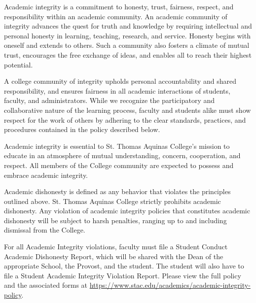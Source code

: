 \documentclass[11pt,letterpaper]{article}
\begin{document}



Academic integrity is a commitment to honesty, trust, fairness, respect, and responsibility within an academic community. An academic community of integrity advances the quest for truth and knowledge by requiring intellectual and personal honesty in learning, teaching, research, and service. Honesty begins with oneself and extends to others. Such a community also fosters a climate of mutual trust, encourages the free exchange of ideas, and enables all to reach their highest potential. \pspace

A college community of integrity upholds personal accountability and shared responsibility, and ensures fairness in all academic interactions of students, faculty, and administrators. While we recognize the participatory and collaborative nature of the learning process, faculty and students alike must show respect for the work of others by adhering to the clear standards, practices, and procedures contained in the policy described below. \pspace

Academic integrity is essential to St. Thomas Aquinas College’s mission to educate in an atmosphere of mutual understanding, concern, cooperation, and respect. All members of the College community are expected to possess and embrace academic integrity. \sectionbreak




Academic dishonesty is defined as any behavior that violates the principles outlined above. St. Thomas Aquinas College strictly prohibits academic dishonesty. Any violation of academic integrity policies that constitutes academic dishonesty will be subject to harsh penalties, ranging up to and including dismissal from the College.

For all Academic Integrity violations, faculty must file a Student Conduct Academic Dishonesty Report, which will be shared with the Dean of the appropriate School, the Provost, and the student. The student will also have to file a Student Academic Integrity Violation Report. Please view the full policy and the associated forms at \url{https://www.stac.edu/academics/academic-integrity-policy}. \sectionbreak
\end{document}
